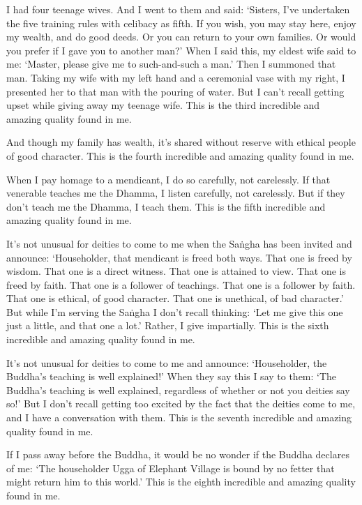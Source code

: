 \documentclass[12pt,openany]{book}%
\begin{document}
I had four teenage wives. And I went to them and said: ‘Sisters, I’ve undertaken the five training rules with celibacy as fifth. If you wish, you may stay here, enjoy my wealth, and do good deeds. Or you can return to your own families. Or would you prefer if I gave you to another man?’ When I said this, my eldest wife said to me: ‘Master, please give me to such-and-such a man.’ Then I summoned that man. Taking my wife with my left hand and a ceremonial vase with my right, I presented her to that man with the pouring of water. But I can’t recall getting upset while giving away my teenage wife. This is the third incredible and amazing quality found in me. 

And though my family has wealth, it’s shared without reserve with ethical people of good character. This is the fourth incredible and amazing quality found in me. 

When I pay homage to a mendicant, I do so carefully, not carelessly. If that venerable teaches me the Dhamma, I listen carefully, not carelessly. But if they don’t teach me the Dhamma, I teach them. This is the fifth incredible and amazing quality found in me. 

It’s not unusual for deities to come to me when the \textsanskrit{Saṅgha} has been invited and announce: ‘Householder, that mendicant is freed both ways. That one is freed by wisdom. That one is a direct witness. That one is attained to view. That one is freed by faith. That one is a follower of teachings. That one is a follower by faith. That one is ethical, of good character. That one is unethical, of bad character.’ But while I’m serving the \textsanskrit{Saṅgha} I don’t recall thinking: ‘Let me give this one just a little, and that one a lot.’ Rather, I give impartially. This is the sixth incredible and amazing quality found in me. 

It’s not unusual for deities to come to me and announce: ‘Householder, the Buddha’s teaching is well explained!’ When they say this I say to them: ‘The Buddha’s teaching is well explained, regardless of whether or not you deities say so!’ But I don’t recall getting too excited by the fact that the deities come to me, and I have a conversation with them. This is the seventh incredible and amazing quality found in me. 

If I pass away before the Buddha, it would be no wonder if the Buddha declares of me: ‘The householder Ugga of Elephant Village is bound by no fetter that might return him to this world.’ This is the eighth incredible and amazing quality found in me. 
\end{document}
